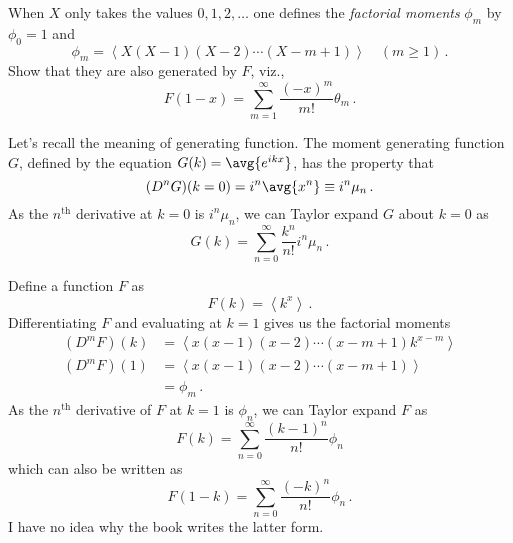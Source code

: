 

When $X$ only takes the values $0, 1, 2,\ldots$ one defines the \emph{factorial moments} $\phi_m$ by $\phi_0 = 1$ and
\begin{equation*}
  \phi_m = \left \langle X (X-1) (X-2) \cdots (X-m+1) \right\rangle \quad (m \geq 1) \, .
\end{equation*}
Show that they are also generated by $F$, viz.,
\begin{equation*}
  F(1 - x) = \sum_{m=1}^\infty \frac{(-x)^m}{m!} \theta_m \, .
\end{equation*}


Let's recall the meaning of generating function.
The moment generating function $G$, defined by the equation $G(k) = \avg{e^{ikx}}$, has the property that
\begin{equation*}
  (D^nG)(k=0) = i^n \avg{x^n} \equiv i^n \mu_n
  \, .
\end{equation*}
As the $n^\text{th}$ derivative at $k=0$ is $i^n \mu_n$, we can Taylor expand $G$ about $k=0$ as
\begin{equation*}
  G(k) = \sum_{n=0}^\infty \frac{k^n}{n!} i^n \mu_n
  \, .
\end{equation*}


Define a function $F$ as
\begin{equation*}
  F(k) = \left \langle k^x \right \rangle
  \, .
\end{equation*}
Differentiating $F$ and evaluating at $k=1$ gives us the factorial moments
\begin{align*}
  (D^m F)(k)
  &= \left\langle x(x-1)(x-2)\cdots(x-m+1) k^{x-m}\right\rangle \\
  (D^m F)(1)
  &= \left\langle x(x-1)(x-2)\cdots(x-m+1)\right\rangle \\
  &= \phi_m \, .
\end{align*}
  As the $n^\text{th}$ derivative of $F$ at $k=1$ is $\phi_n$, we can Taylor expand $F$ as
\begin{equation*}
  F(k) = \sum_{n=0}^\infty \frac{(k-1)^n}{n!} \phi_n
\end{equation*}
which can also be written as
\begin{equation*}
  F(1-k) = \sum_{n=0}^\infty \frac{(-k)^n}{n!} \phi_n
  \, .
\end{equation*}
I have no idea why the book writes the latter form.
